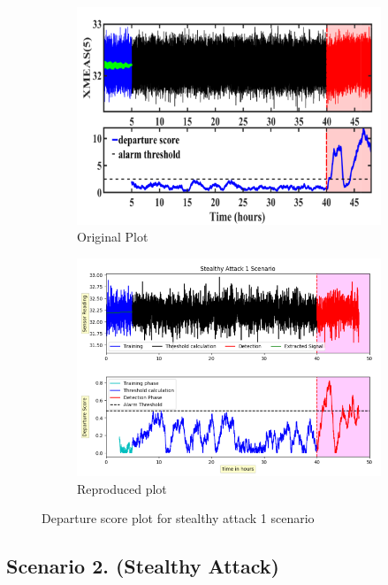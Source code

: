 \begin{figure}[H]	
	\centering
	\begin{subfigure}[t]{0.45\textwidth}
		\centering
		\includegraphics[width=\textwidth]{imgs/sa1orig.png}
		\caption{Original Plot}\label{fig:1a}		
	\end{subfigure}
	\qquad
	\begin{subfigure}[t]{0.45\textwidth}
		\centering
		\includegraphics[width=\textwidth]{imgs/sa1re.png}
		\caption{Reproduced plot}\label{fig:1b}
	\end{subfigure}
	\caption{Departure score plot for stealthy attack 1 scenario}\label{fig:1}
\end{figure}

\subsection*{Scenario 2. (Stealthy Attack)}

